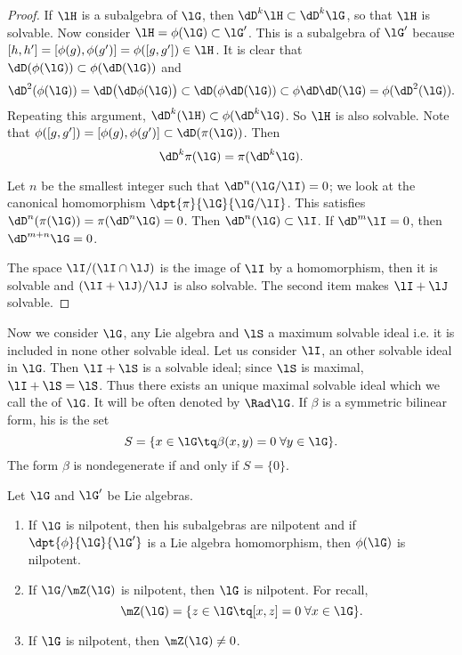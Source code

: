 \begin{proof}
If $\lH$ is a subalgebra of $\lG$, then $\dD^k\lH\subset\dD^k\lG$, so that $\lH$ is solvable. Now consider $\lH=\phi(\lG)\subset\lG'$. This is a subalgebra of $\lG'$ because $[h,h']=[\phi(g),\phi(g')]=\phi([g,g'])\in\lH$. It is clear that $\dD(\phi(\lG))\subset\phi(\dD(\lG))$ and
\begin{equation}
\dD^2(\phi(\lG))=\dD\big( \dD\phi(\lG) \big)
                \subset\dD(\phi\dD(\lG))
        \subset\phi\dD\dD(\lG)
        =\phi(\dD^2(\lG)).
\end{equation}
Repeating this argument, $\dD^k(\lH)\subset\phi(\dD^k\lG)$. So $\lH$ is also solvable. Note that $\phi([g,g'])=[\phi(g),\phi(g')]\subset\dD(\pi(\lG))$. Then
\begin{equation}
  \dD^k\pi(\lG)=\pi(\dD^k\lG).
\end{equation}

Let $n$ be the smallest integer such that $\dD^n(\lG/\lI)=0$; we look at the canonical homomorphism $\dpt{\pi}{\lG}{\lG/\lI}$. This satisfies $\dD^n(\pi(\lG))=\pi(\dD^n\lG)=0$. Then $\dD^n(\lG)\subset\lI$. If $\dD^m\lI=0$, then $\dD^{m+n}\lG=0$.

The space $\lI/(\lI\cap\lJ)$ is the image of $\lI$ by a homomorphism, then it is solvable and $(\lI+\lJ)/\lJ$ is also solvable. The second item makes $\lI+\lJ$ solvable.
\end{proof}

Now we consider $\lG$, any Lie algebra and $\lS$ a maximum solvable ideal i.e. it is included in none other solvable ideal. Let us consider $\lI$, an other solvable ideal in $\lG$. Then $\lI+\lS$ is a solvable ideal; since $\lS$ is maximal, $\lI+\lS=\lS$. Thus there exists an unique maximal solvable ideal which we call the  of $\lG$. It will be often denoted by $\Rad\lG$. If $\beta$ is a symmetric bilinear form, his  is the set
\begin{equation}
  S=\{x\in\lG\tq\beta(x,y)=0\;\forall y\in\lG\}.
\end{equation}
The form $\beta$ is nondegenerate if and only if $S=\{0\}$.

\begin{proposition}
Let $\lG$ and $\lG'$ be Lie algebras.

\begin{enumerate}
\item If $\lG$ is nilpotent, then his subalgebras are nilpotent and if $\dpt{\phi}{\lG}{\lG'}$ is a Lie algebra homomorphism, then $\phi(\lG)$ is nilpotent.

\item If $\lG/\mZ(\lG)$ is nilpotent, then $\lG$ is nilpotent. For recall,
\[
   \mZ(\lG)=\{z\in\lG\tq [x,z]=0\;\forall x\in\lG\}.
\]

\item If $\lG$ is nilpotent, then $\mZ(\lG)\neq 0$.
\end{enumerate}
\label{prop:nil_homom_nil}
\end{proposition}

